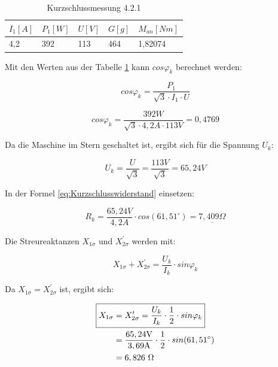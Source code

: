 \documentclass[conference]{IEEEtran}
\begin{document}
\begin{table}[htbp]
    \begin{tabularx}{\columnwidth}{XXXXX}
        \toprule
        $I_1[A]$ & $P_1[W]$ & $U[V]$ & $G[g]$ & $M_{an}[Nm]$ \\
        \midrule
        4,2      & 392      & 113    & 464    & 1,82074      \\
        \bottomrule
    \end{tabularx}
    \caption{Kurzschlussmessung 4.2.1}
    \label{tab:Kurzschlussmessung}
\end{table}

Mit den Werten aus der Tabelle \ref{tab:Kurzschlussmessung} kann $cos\varphi_k$
berechnet werden:

\begin{equation}
    \boxed{cos\varphi_k = \frac{P_1}{\sqrt{3} \cdot I_1 \cdot U}}
\end{equation}

\begin{equation} \label{eq:cosphi_solved}
    cos\varphi_k = \frac{392 \si{W}}{\sqrt{3} \cdot 4,2 \si{A} \cdot 113 \si{V}} = 0,4769
\end{equation}

Da die Maschine im Stern geschaltet ist, ergibt sich für die Spannung $U_k$:

\begin{equation} \label{eq:Uk_solved}
    \boxed{U_k = \frac{U}{\sqrt{3}}} = \frac{113 \si{V}}{\sqrt{3}} = 65,24 \si{V}
\end{equation}

In der Formel \ref{eq:Kurzschlusswiderstand} einsetzen:

\begin{equation} \label{eq:Kurzschlusswiderstand_calc}
    \boxed{R_k = \frac{65,24\si{V}}{4,2\si{A}}\cdot cos(61,51^\circ) = \underline{7,409 \Omega}}
\end{equation}

Die Streureaktanzen $X_{1\sigma}$ und $X_{2\sigma}^\prime$ werden mit:

\begin{equation} \label{eq:Streureaktanzen}
    X_{1\sigma} + X_{2\sigma}^\prime = \frac{U_k}{I_k}\cdot sin\varphi_k
\end{equation}

Da $X_{1\sigma} = X_{2\sigma}^\prime$ ist, ergibt sich:

\begin{align} \label{eq:Streureaktanzen_solved}
    \Aboxed{X_{1\sigma} & = X_{2\sigma}^\prime = \frac{U_k}{I_k}\cdot\frac{1}{2}\cdot sin\varphi_k} \\
                        & = \frac{65,24\si{V}}{3,69\si{A}}\cdot\frac{1}{2}\cdot sin(61,51^\circ)    \\
                        & =6,826\ \Omega
\end{align}
\end{document}
